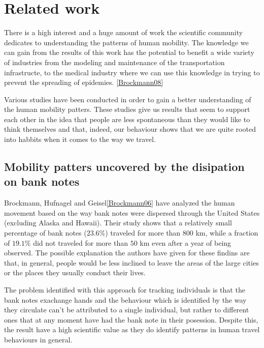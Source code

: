 \chapter{Related work}
There is a high interest and a huge amount of work the scientific community
dedicates to understanding the patterns of human mobility. The knowledge we
can gain from the results of this work has the potential to benefit a wide
variety of industries from the modeling and maintenance of the transportation infrastructe,
to the medical industry where we can use this knowledge in trying to prevent the
spreading of epidemies. \ref{Brockmann08} %

Various studies have been conducted in order to gain a better understanding of
the human mobility patters. These studies give us results that seem to support
each other in the idea that people are less spontaneous than they would like to
think themselves and that, indeed, our behaviour shows that we are quite rooted
into habbits when it comes to the way we travel.

\section{Mobility patters uncovered by the disipation on bank notes}
Brockmann, Hufnagel and Geisel\ref{Brockmann06} have
analyzed the human movement based on the way bank notes were dispersed through
the United States (excluding Alaska and Hawaii). Their study shows that a
relatively small percentage of bank notes ($23.6\%$) traveled for more than
$800$ km, while a fraction of $19.1\%$ did not traveled for more than $50$ km
even after a year of being observed. The possible explanation the authors have
given for these findins are that, in general, people would be less inclined to
leave the areas of the large cities or the places they usually conduct their
lives.

The problem identified with this approach for tracking individuals is that the
bank notes exachange hands and the behaviour which is identified by the way they
circulate can't be attributed to a single individual, but rather to different
ones that at any moment have had the bank note in their posession. Despite this,
the result have a high scientific value as they do identify patterns in human
travel behaviours in general.

